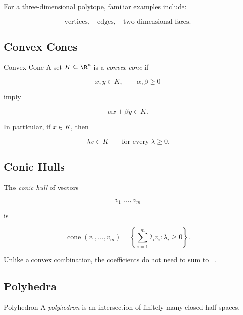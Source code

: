 For a three-dimensional polytope, familiar examples include:

\[
\boxed{
\text{vertices},
\quad
\text{edges},
\quad
\text{two-dimensional faces}.
}
\]

\subsection{Convex Cones}
\label{subsec:convex-cones}

\begin{definitionbox}{Convex Cone}
A set \(K\subseteq\R^n\) is a \emph{convex cone} if

\[
x,y\in K,
\qquad
\alpha,\beta\geq0
\]

imply

\[
\boxed{
\alpha x+\beta y\in K.
}
\]
\end{definitionbox}

In particular, if \(x\in K\), then

\[
\boxed{
\lambda x\in K
\qquad
\text{for every }\lambda\geq0.
}
\]

\subsection{Conic Hulls}
\label{subsec:conic-hulls}

The \emph{conic hull} of vectors

\[
v_1,\ldots,v_m
\]

is

\[
\boxed{
\operatorname{cone}(v_1,\ldots,v_m)
=
\left\{
\sum_{i=1}^{m}\lambda_iv_i:
\lambda_i\geq0
\right\}.
}
\]

Unlike a convex combination, the coefficients do not need to sum to \(1\).

\subsection{Polyhedra}
\label{subsec:polyhedra}

\begin{definitionbox}{Polyhedron}
A \emph{polyhedron} is an intersection of finitely many closed half-spaces.
\end{definitionbox}

